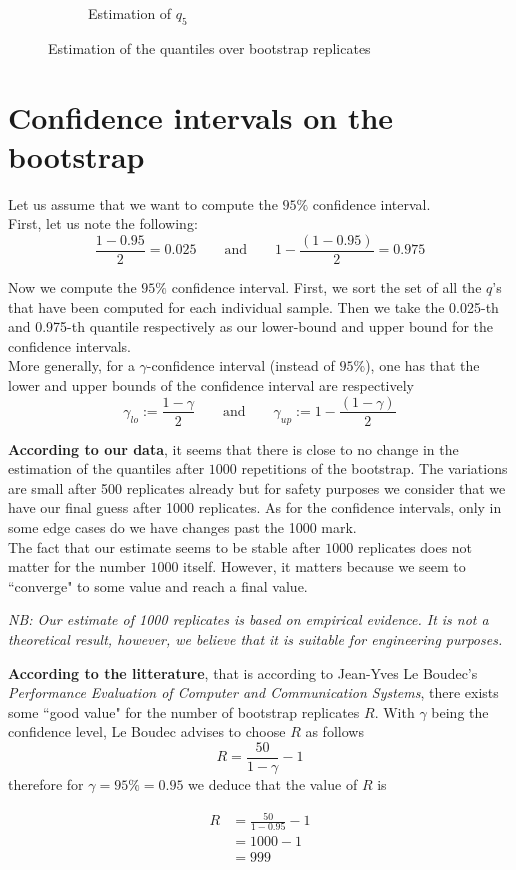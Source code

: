 \documentclass{article}
\begin{document}
\begin{figure}
\begin{subfigure}{.84\textwidth}
        \caption{Estimation of $q_5$}
    \end{subfigure}
    \caption{Estimation of the quantiles over bootstrap replicates}
    \label{fig: estimation of quantiles}
\end{figure}

\section{Confidence intervals on the bootstrap}
\label{section: confidence intervals on the bootstrap}

Let us assume that we want to compute the $95\%$ confidence interval. \\
First, let us note the following:
\begin{equation}
    \label{eq: compute 0.95 CI bounds}
    \frac{1 - 0.95}{2} = 0.025 \qquad \mbox{and} \qquad 1 - \frac{(1 - 0.95)}{2} = 0.975
\end{equation}

Now we compute the $95\%$ confidence interval. First, we sort the set of all the $q$'s that have been computed for each individual sample. Then we take the 0.025-th and 0.975-th quantile respectively as our lower-bound and upper bound for the confidence intervals. \\
More generally, for a $\gamma$-confidence interval (instead of $95\%$), one has that the lower and upper bounds of the confidence interval are respectively
\[
    \gamma_{lo} := \frac{1 - \gamma}{2} \qquad \mbox{and} \qquad \gamma_{up} := 1 - \frac{(1 - \gamma)}{2}
\]


\textbf{According to our data}, it seems that there is close to no change in the estimation of the quantiles after $1000$ repetitions of the bootstrap. The variations are small after 500 replicates already but for safety purposes we consider that we have our final guess after 1000 replicates. As for the confidence intervals, only in some edge cases do we have changes past the 1000 mark. \\
The fact that our estimate seems to be stable after \(1000\) replicates does not matter for the number \(1000\) itself. However, it matters because we seem to ``converge" to some value and reach a final value.

\textit{NB: Our estimate of 1000 replicates is based on empirical evidence. It is not a theoretical result, however, we believe that it is suitable for engineering purposes.}

\textbf{According to the litterature}, that is according to Jean-Yves Le Boudec's \textit{Performance Evaluation of Computer and Communication Systems}, there exists some ``good value" for the number of bootstrap replicates \(R\). With \(\gamma\) being the confidence level, Le Boudec advises to choose \(R\) as follows
\begin{equation}
    R = \frac{50}{1 - \gamma} - 1
\end{equation}
therefore for \(\gamma = 95\% = 0.95\) we deduce that the value of \(R\) is

\begin{align*}
    R & = \frac{50}{1 - 0.95} - 1 \\
      & = 1000 - 1                \\
      & = 999                     \\
\end{align*}
\end{document}
